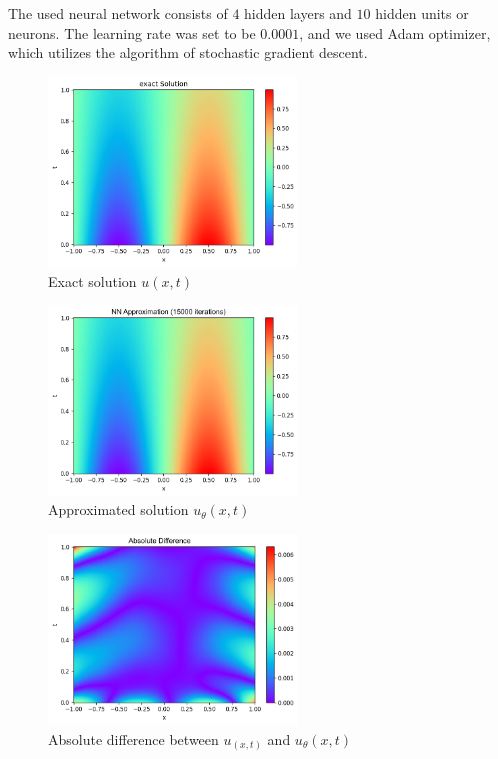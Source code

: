 \documentclass[a4paper, onecolumn, 12pt]{article}
\begin{document}
The used neural network consists of $4$ hidden layers and $10$ hidden units or neurons.
The learning rate was set to be $0.0001$, and we used Adam optimizer, which utilizes the 
algorithm of stochastic gradient descent. 

\begin{figure}[H]
    \centering
    \includegraphics[width=250px]{images/exact_solution_diff.png}
    \vspace{-1em}
    \caption{Exact solution $u(x,t)$}
    \label{exact diff}
\end{figure}

\begin{figure}[H]
    \centering
    \includegraphics[width=250px]{images/approx_solution_diff.png}
    \vspace{-1em}
    \caption{Approximated solution $u_\theta(x,t)$}
    \label{approximation diff}
\end{figure}

\begin{figure}[H]
    \centering
    \includegraphics[width=250px]{images/difference_diff.png}
    \vspace{-1em}
    \caption{Absolute difference between $u_(x,t)$ and $u_\theta(x,t)$}
    \label{absolute diff}
\end{figure}
\end{document}
